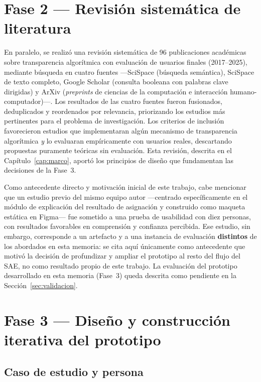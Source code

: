 \section{Fase 2 — Revisión sistemática de literatura}\label{sec:fase2}

En paralelo, se realizó una revisión sistemática de 96 publicaciones académicas sobre transparencia algorítmica con evaluación de usuarios finales (2017--2025), mediante búsqueda en cuatro fuentes —SciSpace (búsqueda semántica), SciSpace de texto completo, Google Scholar (consulta booleana con palabras clave dirigidas) y ArXiv (\emph{preprints} de ciencias de la computación e interacción humano-computador)—. Los resultados de las cuatro fuentes fueron fusionados, deduplicados y reordenados por relevancia, priorizando los estudios más pertinentes para el problema de investigación. Los criterios de inclusión favorecieron estudios que implementaran algún mecanismo de transparencia algorítmica \emph{y} lo evaluaran empíricamente con usuarios reales, descartando propuestas puramente teóricas sin evaluación. Esta revisión, descrita en el Capítulo~\ref{cap:marco}, aportó los principios de diseño que fundamentan las decisiones de la Fase~3.

Como antecedente directo y motivación inicial de este trabajo, cabe mencionar que un estudio previo del mismo equipo autor —centrado específicamente en el módulo de explicación del resultado de asignación y construido como maqueta estática en Figma— fue sometido a una prueba de usabilidad con diez personas, con resultados favorables en comprensión y confianza percibida. Ese estudio, sin embargo, corresponde a un artefacto y a una instancia de evaluación \textbf{distintos} de los abordados en esta memoria: se cita aquí únicamente como antecedente que motivó la decisión de profundizar y ampliar el prototipo al resto del flujo del SAE, no como resultado propio de este trabajo. La evaluación del prototipo desarrollado en esta memoria (Fase~3) queda descrita como pendiente en la Sección~\ref{sec:validacion}.

\section{Fase 3 — Diseño y construcción iterativa del prototipo}\label{sec:fase3}

\subsection{Caso de estudio y persona}\label{sec:fase3-caso}

